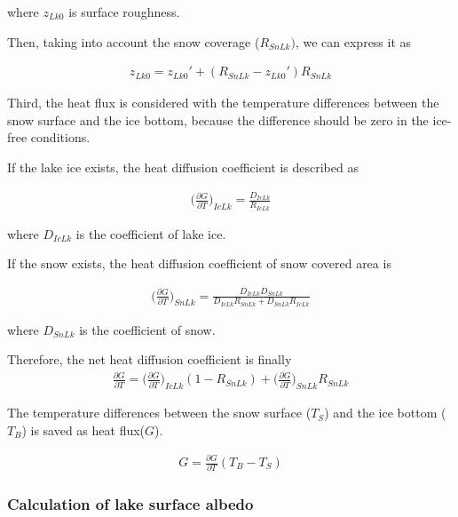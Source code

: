 where \(z_{Lk0}\) is surface roughness.

Then, taking into account the snow coverage (\(R_{SnLk})\), we can
express it as

\begin{eqnarray}
    {z_{Lk0}} = {z_{Lk0}'} + (R_{SnLk} - {z_{Lk0}'}) R_{SnLk}
\end{eqnarray}

Third, the heat flux is considered with the temperature differences
between the snow surface and the ice bottom, because the difference
should be zero in the ice-free conditions.

If the lake ice exists, the heat diffusion coefficient is described as

\begin{eqnarray}
    \Big(\frac{\partial G}{\partial T}\Big) _{ IcLk }  = \frac{ D_{IcLk}}{R_{IcLk}}
\end{eqnarray}

where \(D_{IcLk}\) is the coefficient of lake ice.

If the snow exists, the heat diffusion coefficient of snow covered area
is

\begin{eqnarray}
    \Big(\frac{\partial G}{\partial T}\Big)_{SnLk}  =  \frac{D_{IcLk}D_{SnLk}}{D_{IcLk}R_{SnLk}+D_{SnLk}R_{IcLk}}
\end{eqnarray}

where \(D_{SnLk}\) is the coefficient of snow.

Therefore, the net heat diffusion coefficient is finally \begin{eqnarray}
    \frac{\partial G}{\partial T} = \Big(\frac{\partial G}{\partial T} \Big)_{IcLk} (1-R_{SnLk}) + \Big(\frac{\partial G}{\partial T}\Big)_{SnLk} R_{SnLk}
\end{eqnarray}

The temperature differences between the snow surface (\(T_S\)) and the
ice bottom (\(T_B\)) is saved as heat flux(\(G\)).

\begin{eqnarray}
    G = \frac{\partial G}{\partial T} (T_B-T_S)
\end{eqnarray}

\hypertarget{calculation-of-lake-surface-albedo}{%
\subsubsection{Calculation of lake surface
albedo}\label{calculation-of-lake-surface-albedo}}

